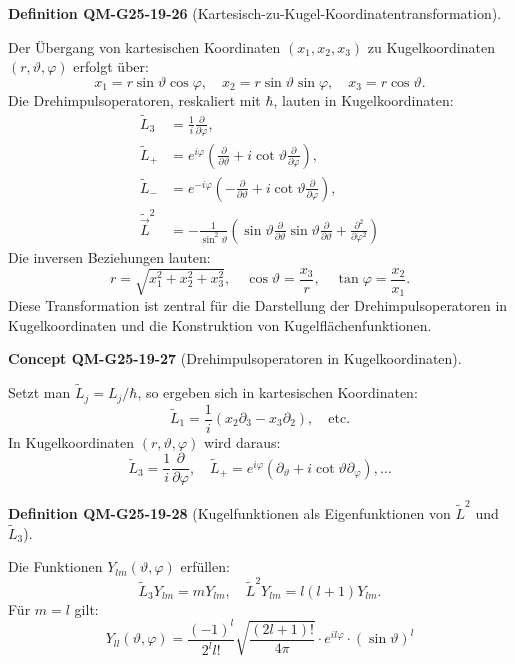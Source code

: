 \documentclass[10pt, letterpaper]{article}
\newcommand{\CustomHeading}[3]{%
  \par\medskip\noindent%
  \textbf{#1 #2} \textnormal{(#3)}.\enskip%
}
\newenvironment{DEF}[2]{\CustomHeading{Definition}{#1}{#2}}{}
\newenvironment{CONC}[2]{\CustomHeading{Concept}{#1}{#2}}{}
\begin{document}
\begin{DEF}{QM-G25-19-26}{Kartesisch-zu-Kugel-Koordinatentransformation}
Der Übergang von kartesischen Koordinaten \((x_1, x_2, x_3)\) zu Kugelkoordinaten \((r, \vartheta, \varphi)\) erfolgt über:
$$
x_1 = r \sin \vartheta \cos \varphi, \quad
x_2 = r \sin \vartheta \sin \varphi, \quad
x_3 = r \cos \vartheta.
$$
Die Drehimpulsoperatoren, reskaliert mit \(\hbar\), lauten in Kugelkoordinaten:
$$
\begin{aligned}
\tilde{L}_3 &= \frac{1}{i} \frac{\partial}{\partial \varphi}, \\
\tilde{L}_{+} &= e^{i \varphi} \left( \frac{\partial}{\partial \vartheta} + i \cot \vartheta \frac{\partial}{\partial \varphi} \right), \\
\tilde{L}_{-} &= e^{-i \varphi} \left( -\frac{\partial}{\partial \vartheta} + i \cot \vartheta \frac{\partial}{\partial \varphi} \right), \\
\tilde{\vec{L}}^2 &= -\frac{1}{\sin^2 \vartheta} \left( \sin \vartheta \frac{\partial}{\partial \vartheta} \sin \vartheta \frac{\partial}{\partial \vartheta} + \frac{\partial^2}{\partial \varphi^2} \right)
\end{aligned}
$$
Die inversen Beziehungen lauten:
$$
r = \sqrt{x_1^2 + x_2^2 + x_3^2}, \quad
\cos \vartheta = \frac{x_3}{r}, \quad
\tan \varphi = \frac{x_2}{x_1}.
$$
Diese Transformation ist zentral für die Darstellung der Drehimpulsoperatoren in Kugelkoordinaten und die Konstruktion von Kugelflächenfunktionen.
\end{DEF}

\begin{CONC}{QM-G25-19-27}{Drehimpulsoperatoren in Kugelkoordinaten}
Setzt man \(\tilde{L}_j = L_j / \hbar\), so ergeben sich in kartesischen Koordinaten:
$$
\tilde{L}_1 = \frac{1}{i}(x_2 \partial_3 - x_3 \partial_2), \quad \text{etc.}
$$
In Kugelkoordinaten \((r, \vartheta, \varphi)\) wird daraus:
$$
\tilde{L}_3 = \frac{1}{i} \frac{\partial}{\partial \varphi}, \quad
\tilde{L}_+ = e^{i \varphi} \left( \partial_\vartheta + i \cot \vartheta \partial_\varphi \right), \dots
$$
\end{CONC}

\begin{DEF}{QM-G25-19-28}{Kugelfunktionen als Eigenfunktionen von \(\tilde{L}^2\) und \(\tilde{L}_3\)}
Die Funktionen \(Y_{lm}(\vartheta, \varphi)\) erfüllen:
$$
\tilde{L}_3 Y_{lm} = m Y_{lm}, \quad \tilde{L}^2 Y_{lm} = l(l+1) Y_{lm}.
$$
Für \(m = l\) gilt:
$$
Y_{ll}(\vartheta, \varphi) = \frac{(-1)^l}{2^l l!} \sqrt{\frac{(2l+1)!}{4\pi}} \cdot e^{i l \varphi} \cdot (\sin \vartheta)^l
$$
\end{DEF}
\end{document}
